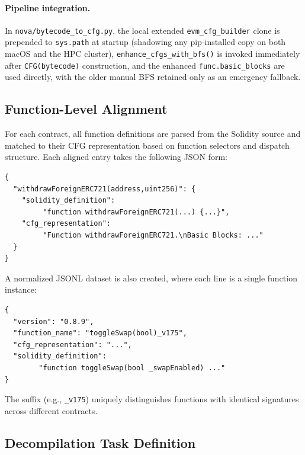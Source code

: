 \documentclass{article}
\begin{document}
\paragraph{Pipeline integration.}
In \texttt{nova/bytecode\_to\_cfg.py}, the local extended \texttt{evm\_cfg\_builder}
clone is prepended to \texttt{sys.path} at startup (shadowing any pip-installed
copy on both macOS and the HPC cluster), \texttt{enhance\_cfgs\_with\_bfs()} is
invoked immediately after \texttt{CFG(bytecode)} construction, and the enhanced
\texttt{func.basic\_blocks} are used directly, with the older manual BFS retained
only as an emergency fallback.

\subsection{Function-Level Alignment}

For each contract, all function definitions are parsed from the Solidity source and
matched to their CFG representation based on function selectors and dispatch
structure. Each aligned entry takes the following JSON form:

\noindent\begin{small}
\begin{verbatim}
{
  "withdrawForeignERC721(address,uint256)": {
    "solidity_definition":
         "function withdrawForeignERC721(...) {...}",
    "cfg_representation":
         "Function withdrawForeignERC721.\nBasic Blocks: ..."
  }
}
\end{verbatim}
\end{small}

A normalized JSONL dataset is also created, where each line is a single function
instance:

\noindent\begin{small}
\begin{verbatim}
{
  "version": "0.8.9",
  "function_name": "toggleSwap(bool)_v175",
  "cfg_representation": "...",
  "solidity_definition":
        "function toggleSwap(bool _swapEnabled) ..."
}
\end{verbatim}
\end{small}

The suffix (e.g., \texttt{\_v175}) uniquely distinguishes functions with identical
signatures across different contracts.

\subsection{Decompilation Task Definition}
\end{document}
